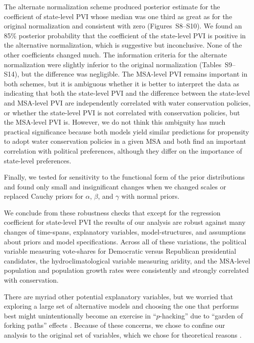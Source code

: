 \documentclass[draft,linenumbers]{agujournal}\usepackage{knitr}
\begin{document}
The alternate normalization scheme produced posterior estimate for the
coefficient of state-level PVI whose median was one third as great as for the original
normalization and consistent with zero (Figures~S8--S10).
We found an 85\% posterior probability that the coefficient of the state-level PVI
is positive in the alternative normalization, which is suggestive but inconclusive.
None of the other coefficients changed much.
The information criteria for the alternate normalization were
slightly inferior to
the original normalization (Tables~S9--S14),
but the difference was negligible. The
MSA-level PVI remains important in both schemes,
but it is ambiguous whether it is
better to interpret the data as indicating that both the state-level PVI
and the difference between the state-level and MSA-level PVI are independently
correlated with water conservation policies, or whether the state-level PVI
is not correlated with conservation policies, but the MSA-level PVI is.
However, we do not think this ambiguity has much practical significance
because both models yield similar predictions for propensity to adopt
water conservation policies in a given MSA and both find an important
correlation with political preferences, although they differ on the importance
of state-level preferences.

Finally, we tested for sensitivity to the functional form of the prior
distributions and found only small and insignificant changes when we
changed scales or replaced Cauchy priors for $\alpha$, $\beta$, and
$\gamma$ with normal priors.

We conclude from these robustness checks that
except for the regression coefficient for state-level PVI
the results
of our analysis are robust against many changes of time-spans,
explanatory variables, model-structures, and assumptions about priors
and model specifications.
Across all of these variations, the political variable measuring
vote-shares for Democratic versus Republican presidential candidates,
the hydroclimatological variable measuring aridity, and the
MSA-level population and population growth rates were
consistently and strongly correlated with conservation.

There are myriad other potential explanatory variables,
but we worried that exploring a large set of alternative models
and choosing the one that performs best might
unintentionally become an exercise in ``$p$-hacking'' due to
``garden of forking paths'' effects \citep{gelman:forking.paths:2014}.
Because of these concerns, we chose to confine our analysis to the original set
of variables, which we chose for theoretical reasons
\citep{hess:drought:2016}.
\end{document}
